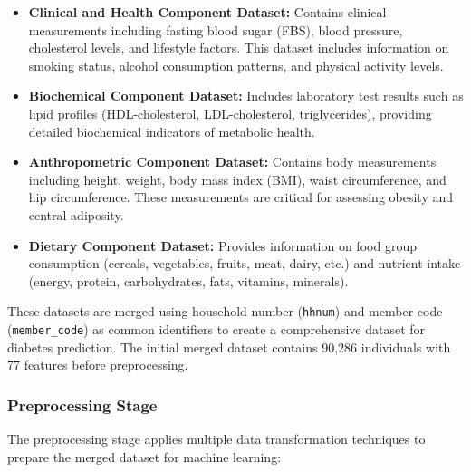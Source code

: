 \begin{itemize}
    \item \textbf{Clinical and Health Component Dataset:} Contains clinical measurements including fasting blood sugar (FBS), blood pressure, cholesterol levels, and lifestyle factors. This dataset includes information on smoking status, alcohol consumption patterns, and physical activity levels.
    \item \textbf{Biochemical Component Dataset:} Includes laboratory test results such as lipid profiles (HDL-cholesterol, LDL-cholesterol, triglycerides), providing detailed biochemical indicators of metabolic health.
    \item \textbf{Anthropometric Component Dataset:} Contains body measurements including height, weight, body mass index (BMI), waist circumference, and hip circumference. These measurements are critical for assessing obesity and central adiposity.
    \item \textbf{Dietary Component Dataset:} Provides information on food group consumption (cereals, vegetables, fruits, meat, dairy, etc.) and nutrient intake (energy, protein, carbohydrates, fats, vitamins, minerals).
\end{itemize}

These datasets are merged using household number (\texttt{hhnum}) and member code (\texttt{member\_code}) as common identifiers to create a comprehensive dataset for diabetes prediction. The initial merged dataset contains 90,286 individuals with 77 features before preprocessing.

\subsubsection{Preprocessing Stage}

The preprocessing stage applies multiple data transformation techniques to prepare the merged dataset for machine learning:

